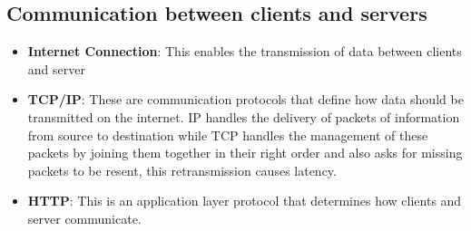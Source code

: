 \subsection{Communication between clients and servers}
\begin{itemize}
 \item \textbf{Internet Connection}: This enables the transmission of data between clients and server
 \item \textbf{TCP/IP}: These are communication protocols that define how data should be transmitted on the internet. IP handles the delivery of packets of information from source to destination while TCP handles the management of these packets by joining them together in their right order and also asks for missing packets to be resent, this retransmission causes latency.
 \item \textbf{HTTP}: This is an application layer protocol that determines how clients and server communicate.
\end{itemize}
 

